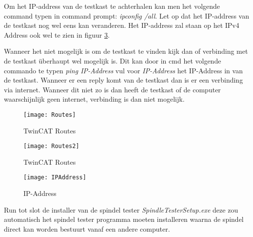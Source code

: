 \vspace{0.5cm}

Om het IP-address van de testkast te achterhalen kan men het volgende command typen in command prompt: \textit{ipconfig /all}. Let op dat het IP-address van de testkast nog wel eens kan veranderen. Het IP-address zal staan op het IPv4 Address ook wel te zien in figuur \ref{fig:IPAddress}.

\vspace{0.5cm}

Wanneer het niet mogelijk is om de testkast te vinden kijk dan of verbinding met de testkast überhaupt wel mogelijk is. Dit kan door in cmd het volgende commando te typen \textit{ping IP-Address} vul voor \textit{IP-Address} het IP-Address in van de testkast. Wanneer er een reply komt van de testkast dan is er een verbinding via internet. Wanneer dit niet zo is dan heeft de testkast of de computer waarschijnlijk geen internet, verbinding is dan niet mogelijk.

 \begin{figure}[H]
 	\centering
 	\texttt{[image: Routes]}
 	\caption{\gls{TwinCAT} Routes}
 	\label{fig:Routes}
 \end{figure}
 
 \begin{figure}[H]
 	\centering
 	\texttt{[image: Routes2]}
 	\caption{\gls{TwinCAT} Routes}
 	\label{fig:Routes2}
 \end{figure}
 
  \begin{figure}[H]
 	\centering
 	\texttt{[image: IPAddress]}
 	\caption{IP-Address}
 	\label{fig:IPAddress}
 \end{figure}
 
 Run tot slot de installer van de spindel tester \textit{SpindleTesterSetup.exe} deze zou automatisch het spindel tester programma moeten installeren waarna de spindel direct kan worden bestuurt vanaf een andere computer.
 
 
	